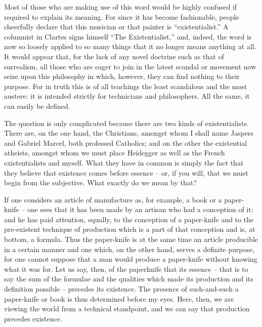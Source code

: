 \documentclass[12pt]{article}
\begin{document}
Most of those who are making use of this word would be highly confused if required to explain its meaning. For since it has become fashionable, people cheerfully declare that this musician or that painter is “existentialist.” A columnist in Clartes signs himself “The Existentialist,” and, indeed, the word is now so loosely applied to so many things that it no longer means anything at all. It would appear that, for the lack of any novel doctrine such as that of surrealism, all those who are eager to join in the latest scandal or movement now seize upon this philosophy in which, however, they can find nothing to their purpose. For in truth this is of all teachings the least scandalous and the most austere: it is intended strictly for technicians and philosophers. All the same, it can easily be defined.

The question is only complicated because there are two kinds of existentialists. There are, on the one hand, the Christians, amongst whom I shall name Jaspers and Gabriel Marcel, both professed Catholics; and on the other the existential atheists, amongst whom we must place Heidegger as well as the French existentialists and myself. What they have in common is simply the fact that they believe that existence comes before essence – or, if you will, that we must begin from the subjective. What exactly do we mean by that?

If one considers an article of manufacture as, for example, a book or a paper-knife – one sees that it has been made by an artisan who had a conception of it; and he has paid attention, equally, to the conception of a paper-knife and to the pre-existent technique of production which is a part of that conception and is, at bottom, a formula. Thus the paper-knife is at the same time an article producible in a certain manner and one which, on the other hand, serves a definite purpose, for one cannot suppose that a man would produce a paper-knife without knowing what it was for. Let us say, then, of the paperknife that its essence – that is to say the sum of the formulae and the qualities which made its production and its definition possible – precedes its existence. The presence of such-and-such a paper-knife or book is thus determined before my eyes. Here, then, we are viewing the world from a technical standpoint, and we can say that production precedes existence.
\end{document}
